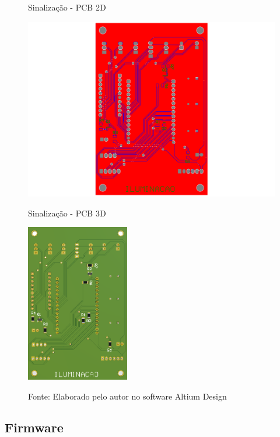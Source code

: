 \documentclass[../delivery_hospital_report.tex]{subfiles}
\begin{document}
\begin{figure}[!ht]
    \centering
    \begin{minipage}{0.5\textwidth}
        \centering
        \caption{Sinalização - PCB 2D}
        \includegraphics[width=1.03\textwidth]{modulos/Sinalização_Official-5.png} 
        \label{fig:figura1minipg}
    \end{minipage}\hfill
    \begin{minipage}{0.5\textwidth}
        \centering
        \caption{Sinalização - PCB 3D }
        \includegraphics[width=0.4\textwidth]{modulos/Sinalização_Official.png} 
        \label{fig:figura1minipg}
    \end{minipage}\hfill
    
    \caption*{Fonte: Elaborado pelo autor no software Altium Design\cite{altium21} }
    \label{fig:figurasminipg}
\end{figure}

\subsection{Firmware}
\end{document}
